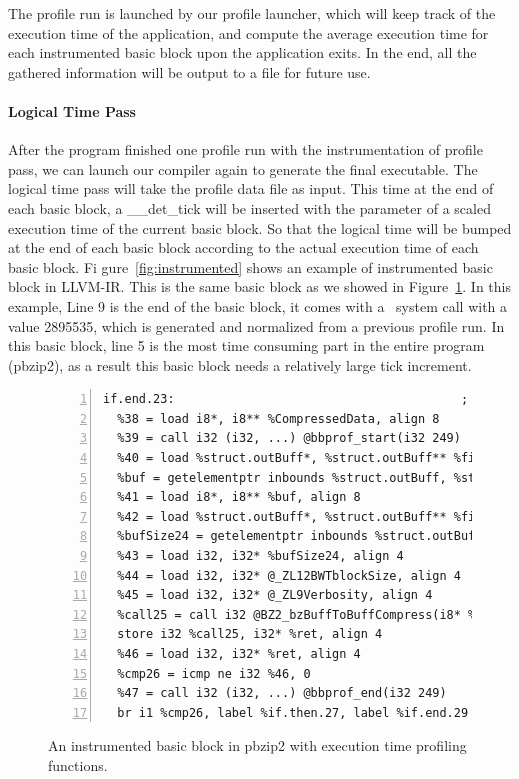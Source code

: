The profile run is launched by our profile launcher, which will keep track of the execution time of the application, and compute the average execution time for each instrumented basic block upon the application exits. In the end, all the gathered information will be output to a file for future use.

\paragraph{Logical Time Pass}
After the program finished one profile run with the instrumentation of profile pass, we can launch our compiler again to generate the final executable. The logical time pass will take the profile data file as input. This time at the end of each basic block, a \_\_det\_tick will be inserted with the parameter of a scaled execution time of the current basic block. So that the logical time will be bumped at the end of each basic block according to the actual execution time of each basic block. Fi gure~\ref{fig:instrumented} shows an example of instrumented basic block in LLVM-IR. This is the same basic block as we showed in Figure~\ref{fig:profiled}. In this example, Line 9 is the end of the basic block, it comes with a \dettick\ system call with a value 2895535, which is generated and normalized from a previous profile run. In this basic block, line 5 is the most time consuming part in the entire program (pbzip2), as a result this basic block needs a relatively large tick increment.

\begin{figure}
\centering
\begin{lstlisting}[numbers=left, frame=single, basicstyle=\small, breaklines]
if.end.23:                                        ; preds = %for.end
  %38 = load i8*, i8** %CompressedData, align 8
  %39 = call i32 (i32, ...) @bbprof_start(i32 249)
  %40 = load %struct.outBuff*, %struct.outBuff** %fileData, align 8
  %buf = getelementptr inbounds %struct.outBuff, %struct.outBuff* %40, i32 0, i32 0
  %41 = load i8*, i8** %buf, align 8
  %42 = load %struct.outBuff*, %struct.outBuff** %fileData, align 8
  %bufSize24 = getelementptr inbounds %struct.outBuff, %struct.outBuff* %42, i32 0, i32 1
  %43 = load i32, i32* %bufSize24, align 4
  %44 = load i32, i32* @_ZL12BWTblockSize, align 4
  %45 = load i32, i32* @_ZL9Verbosity, align 4
  %call25 = call i32 @BZ2_bzBuffToBuffCompress(i8* %38, i32* %outSize, i8* %41, i32 %43, i32 %44, i32 %45, i32 30)
  store i32 %call25, i32* %ret, align 4
  %46 = load i32, i32* %ret, align 4
  %cmp26 = icmp ne i32 %46, 0
  %47 = call i32 (i32, ...) @bbprof_end(i32 249)
  br i1 %cmp26, label %if.then.27, label %if.end.29
\end{lstlisting}
\caption{An instrumented basic block in pbzip2 with execution time profiling functions.}
\label{fig:profiled}
\end{figure}

